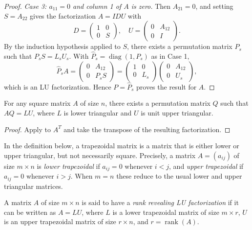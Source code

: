 \documentclass[10pt,twoside]{siamart1116}
\DeclareMathOperator{\rk}{rank}
\newcommand{\by}{\times}
\numberwithin{theorem}{section}
\begin{document}
\begin{proof}
  \emph{Case 3: $a_{11} = 0$ and column 1 of $A$ is zero.} Then $A_{21} = 0$, and setting $S = A_{22}$ gives the factorization $A = IDU$ with
  \[
    D =
    \begin{pmatrix}
      1 & 0 \\
      0 & S
    \end{pmatrix}, \quad
    U =
    \begin{pmatrix}
      0 & A_{12} \\
      0 & I
    \end{pmatrix}.
  \]
  By the induction hypothesis applied to $S$, there exists a permutation matrix $P_s$ such that $P_s S = L_s U_s$. With $\widehat{P}_s = \operatorname{diag}(1, P_s)$ as in Case 1,
  \[
    \widehat{P}_s A
    =
    \begin{pmatrix}
      0 & A_{12}  \\
      0 & P_s S
    \end{pmatrix}
    =
    \begin{pmatrix}
      1 & 0   \\
      0 & L_s
    \end{pmatrix}
    \begin{pmatrix}
      0 & A_{12} \\
      0 & U_s
    \end{pmatrix},
  \]
  which is an LU factorization. Hence $P = \widehat{P}_s$ proves the result for $A$.
\end{proof}

\begin{corollary}\label{cor:col_permutation}
  For any square matrix $A$ of size $n$, there exists a permutation matrix $Q$ such that $AQ = LU$, where $L$ is lower triangular and $U$ is unit upper triangular.
\end{corollary}

\begin{proof}
  Apply  to $A^T$ and take the transpose of the resulting factorization.
\end{proof}

In the definition below, a trapezoidal matrix is a matrix that is either lower or upper triangular, but not necessarily square. Precisely, a matrix $A = (a_{ij})$ of size $m \by n$ is \emph{lower trapezoidal} if $a_{ij} = 0$ whenever $i < j$, and \emph{upper trapezoidal} if $a_{ij} = 0$ whenever $i > j$. When $m = n$ these reduce to the usual lower and upper triangular matrices.

\begin{definition}\label{def:rank_revealing}
  A matrix $A$ of size $m \by n$ is said to have a \emph{rank revealing LU factorization} if it can be written as $A = LU$, where $L$ is a lower trapezoidal matrix of size $m \by r$, $U$ is an upper trapezoidal matrix of size $r \by n$, and $r = \rk(A)$.
\end{definition}
\end{document}
